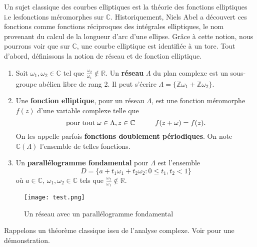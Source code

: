 \documentclass[a4paper]{article}
\begin{document}
\noindent Un sujet classique des courbes elliptiques est la théorie des fonctions 
elliptiques i.e  lesfonctions méromorphes sur $\mathbb{C}$. Historiquement, Niels Abel a découvert ces fonctions comme fonctions réciproques des intégrales elliptiques, le nom provenant du calcul de la longueur d'arc d'une ellipse.
Grâce à cette notion, nous pourrons voir que sur $\mathbb{C}$, une courbe elliptique est identifiée à un tore. 
Tout d'abord, définissons la notion de réseau et de fonction elliptique.
\begin{definition}
\begin{enumerate}
\item
Soit $\omega_{1},\omega_{2} \in \mathbb{C}$ tel que $\frac{\omega_{2}}{\omega_{1}} \not \in \mathbb{R}$. Un \textbf{réseau} $\Lambda$ du plan complexe est un 
sous-groupe abélien libre de rang 2. Il peut s'écrire
$\Lambda=\{\mathbb{Z}\omega_{1}+\mathbb{Z}\omega_{2} \} $.
\item
 Une \textbf{fonction elliptique}, pour un réseau $\Lambda$, est une fonction méromorphe $f(z)$ d'une variable complexe telle que
\begin{equation*}
\text{pour} \hspace{0.1cm} \text{tout} \hspace{0.1cm} \omega \in \Lambda, z \in \mathbb{C}  \hspace{1cm} f(z+\omega)=f(z).
\end{equation*}
On les appelle parfois \textbf{fonctions doublement périodiques}. On note $\mathbb{C}(\Lambda)$ l'ensemble de telles fonctions.
\item Un \textbf{parallélogramme fondamental} pour $\Lambda$ est l'ensemble
\begin{equation*}
D=\{a+t_{1}\omega_{1}+t_{2}\omega_{2} : 0 \leqslant t_{1},t_{2} <1 \}
\end{equation*}
où $a \in \mathbb{C}$, $\omega_{1},\omega_{2} \in \mathbb{C}$ tels que $\frac{\omega_{2}}{\omega_{1}} \not \in \mathbb{R}$.
\end{enumerate}
\end{definition}
\begin{figure}[!h]
\centering
\texttt{[image: test.png]}
\caption{Un réseau avec un parallélogramme fondamental}
\label{neutre}
\end{figure}
\newpage
 \noindent Rappelons un théorème classique issu de l'analyse complexe. Voir \cite{ref29} pour une démonstration.
\end{document}
